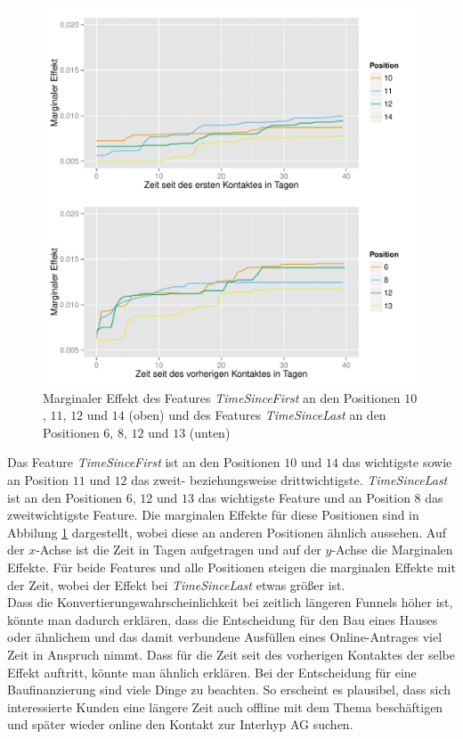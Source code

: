 \begin{figure}[H]
	\centering\includegraphics[scale=0.75]{marg_eff_time.pdf}\caption[Marginaler Effekt von \textit{TimeSinceFirst} und \textit{TimeSinceLast}]{Marginaler Effekt des Features \textit{TimeSinceFirst} an den Positionen $10$, $11$, $12$ und $14$ (oben) und des Features \textit{TimeSinceLast} an den Positionen $6$, $8$, $12$ und $13$ (unten)}\label{marg_eff_time}
\end{figure}
\noindent Das Feature \textit{TimeSinceFirst} ist an den Positionen $10$ und $14$ das wichtigste sowie an Position $11$ und $12$ das zweit- beziehungsweise drittwichtigste. \textit{TimeSinceLast} ist an den Positionen $6$, $12$ und $13$ das wichtigste Feature und an Position $8$ das zweitwichtigste Feature. Die marginalen Effekte für diese Positionen sind in Abbilung \ref{marg_eff_time} dargestellt, wobei diese an anderen Positionen ähnlich aussehen. Auf der $x$-Achse ist die Zeit in Tagen aufgetragen und auf der $y$-Achse die Marginalen Effekte. Für beide Features und alle Positionen steigen die marginalen Effekte mit der Zeit, wobei der Effekt bei \textit{TimeSinceLast} etwas größer ist.\\
Dass die Konvertierungswahrscheinlichkeit bei zeitlich längeren Funnels höher ist, könnte man dadurch erklären, dass die Entscheidung für den Bau eines Hauses oder ähnlichem und das damit verbundene Ausfüllen eines Online-Antrages viel Zeit in Anspruch nimmt. Dass für die Zeit seit des vorherigen Kontaktes der selbe Effekt auftritt, könnte man ähnlich erklären. Bei der Entscheidung für eine Baufinanzierung sind viele Dinge zu beachten. So erscheint es plausibel, dass sich interessierte Kunden eine längere Zeit auch offline mit dem Thema beschäftigen und später wieder online den Kontakt zur Interhyp AG suchen.\\
